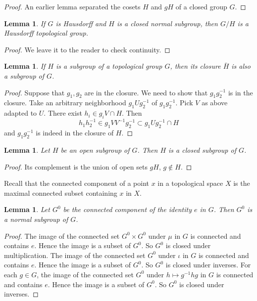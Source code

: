 \documentclass{amsart}
\newtheorem{lemma}[equation]{Lemma}
\begin{document}
\begin{proof}
An earlier lemma separated the cosets $H$ and $gH$ of a closed group $G$.
\end{proof}

\begin{lemma}  If $G$ is Hausdorff and $H$ is a closed normal subgroup, then
$G/H$ is a Hausdorff topological group.
\end{lemma}

\begin{proof} We leave it to the reader to check continuity.
\end{proof}

\begin{lemma} If $H$ is a subgroup of a topological group $G$, 
then its closure $\bar H$ is also a subgroup
of $G$.
\end{lemma}

\begin{proof} Suppose that $g_1,g_2$ are in the closure.  We need to
show that $g_1 g_2^{-1}$ is in the closure.  Take an arbitrary neighborhood
$g_1 U g_2^{-1}$ of $g_1 g_2^{-1}$.  Pick $V$ as above adapted to $U$.
There exist $h_i\in g_i V\cap H$.  Then 
\[
h_1 h_2^{-1}\in g_1VV^{-1}g_2^{-1}\subset g_1Ug_2^{-1} \cap H
\]
and
$g_1 g_2^{-1}$ is indeed in the closure of $H$.
\end{proof}

\begin{lemma} Let $H$ be an open subgroup of $G$.  Then $H$ is a closed subgroup
of $G$.
\end{lemma}

\begin{proof}  Its complement is the union of open sets $g H$, $g\not\in H$.
\end{proof}

 Recall that the connected
component of a point $x$ in a topological space $X$ is the maximal connected subset
containing $x$ in $X$.

\begin{lemma} Let $G^0$ be the connected component of the identity $e$ in $G$.
Then $G^0$ is a normal subgroup of $G$.
\end{lemma}

\begin{proof}
  The image of the connected set $G^0\times G^0$ under $\mu$ in $G$ is
  connected and contains $e$.  Hence the image is a subset of $G^0$.
  So $G^0$ is closed under multiplication.  The image of the connected
  set $G^0$ under $\iota$ in $G$ is connected and contains $e$.  Hence
  the image is a subset of $G^0$.  So $G^0$ is closed under inverses.
  For each $g\in G$, the image of the connected set $G^0$ under
  $h\mapsto g^{-1}hg$ in $G$ is connected and contains $e$.  Hence the
  image is a subset of $G^0$.  So $G^0$ is closed under inverses.
\end{proof}
\end{document}
